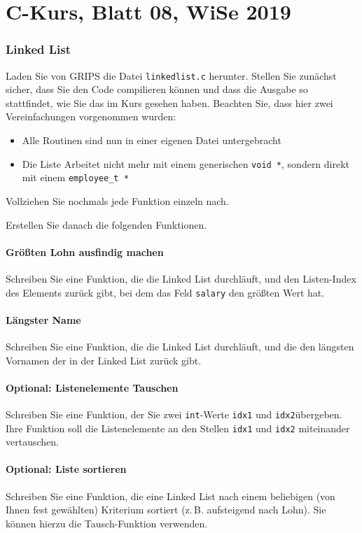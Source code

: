 \documentclass[
	ngerman,
	fontsize=10pt,
	parskip=half,
	titlepage=true,
	DIV=12
]{scrartcl}
\begin{document}
\part*{C-Kurs, Blatt 08, WiSe 2019}

\section*{Linked List}
Laden Sie von GRIPS die Datei \texttt{linkedlist.c} herunter. Stellen Sie zunächst sicher, dass Sie den Code compilieren können und dass die Ausgabe so stattfindet, wie Sie das im Kurs gesehen haben. Beachten Sie, dass hier zwei Vereinfachungen vorgenommen wurden:
\begin{itemize}
\item Alle Routinen sind nun in einer eigenen Datei untergebracht
\item Die Liste Arbeitet nicht mehr mit einem generischen \texttt{void *}, sondern direkt mit
	  einem \texttt{employee_t *}
\end{itemize}

Vollziehen Sie nochmals jede Funktion einzeln nach.

Erstellen Sie danach die folgenden Funktionen.

\subsection*{Größten Lohn ausfindig machen}
Schreiben Sie eine Funktion, die die Linked List durchläuft, und den Listen-Index des Elements zurück gibt, bei dem das Feld \texttt{salary} den größten Wert hat.

\subsection*{Längster Name}
Schreiben Sie eine Funktion, die die Linked List durchläuft, und die den längsten Vornamen der in der Linked List zurück gibt.

\subsection*{Optional: Listenelemente Tauschen}
Schreiben Sie eine Funktion, der Sie zwei \texttt{int}-Werte \texttt{idx1} und \texttt{idx2}übergeben. Ihre Funktion soll die Listenelemente an den Stellen \texttt{idx1} und \texttt{idx2} miteinander vertauschen.

\subsection*{Optional: Liste sortieren}
Schreiben Sie eine Funktion, die eine Linked List nach einem beliebigen (von Ihnen fest gewählten) Kriterium sortiert (z.\,B. aufsteigend nach Lohn). Sie können hierzu die Tausch-Funktion verwenden.
\end{document}
